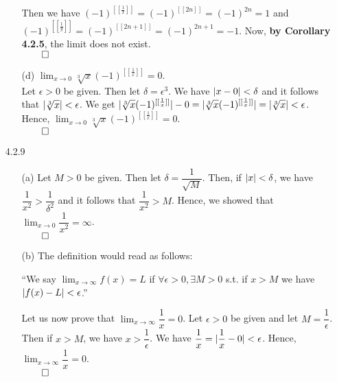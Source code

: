 \documentclass[11pt]{article}
\DeclarePairedDelimiter\abs{\lvert}{\rvert}%
\begin{document}
\begin{itemize}
\begin{itemize}
                Then we have $(-1)^{[[\frac{1}{x}]]} = (-1)^{[[2n]]} =
                (-1)^{2n} = 1$ and $(-1)^{[[\frac{1}{y}]]} = (-1)^{[[2n + 1]]}
                = (-1)^{2n + 1} = -1$. Now, \textbf{by Corollary 4.2.5}, the
                limit does not exist.\\
                $\qed$

            \item[(d)]
                $\lim_{x \to 0} \sqrt[3]{x}(-1)^{[[\frac{1}{x}]]} = 0$.
                \\
                Let $\epsilon > 0$ be given. Then let $\delta = \epsilon^3$.
                We have $\abs{x - 0} < \delta$ and it follows that
                $\abs{\sqrt[3]{x}} < \epsilon$. We get
                $\abs{\sqrt[3]{x}(-1)^{[[\frac{1}{x}]]}} - 0 =
                \abs{\sqrt[3]{x}(-1)^{[[\frac{1}{x}]]}} = \abs{\sqrt[3]{x}} <
                \epsilon$. Hence, $\lim_{x \to 0}
                \sqrt[3]{x}(-1)^{[[\frac{1}{x}]]} = 0$.\\
                $\qed$
        \end{itemize}

    \item[4.2.9]
        \begin{itemize}
            \item[(a)]
                Let $M > 0$ be given. Then let $\delta = \dfrac{1}{\sqrt{M}}$.
                Then, if $\abs{x} < \delta$, we have $\dfrac{1}{x^2} >
                \dfrac{1}{\delta^2}$ and it follows that $\dfrac{1}{x^2} > M$.
                Hence, we showed that $\lim_{x \to 0} \dfrac{1}{x^2} =
                \infty$.\\
                $\qed$

            \item[(b)]
                The definition would read as follows:

                ``We say $\lim_{x \to \infty} f(x) = L$ if $\forall \epsilon >
                0, \exists M > 0$ s.t. if $x > M$ we have $\abs{f(x) - L} <
                \epsilon$.''

                Let us now prove that $\lim_{x \to \infty} \dfrac{1}{x} = 0$.
                Let $\epsilon > 0$ be given and let $M = \dfrac{1}{\epsilon}$.
                Then if $x > M$, we have $x > \dfrac{1}{\epsilon}$. We have
                $\dfrac{1}{x} = \abs{\dfrac{1}{x} - 0} < \epsilon$. Hence,
                $\lim_{x \to \infty} \dfrac{1}{x} = 0$.\\
                $\qed$


\end{itemize}
\end{itemize}
\end{document}
